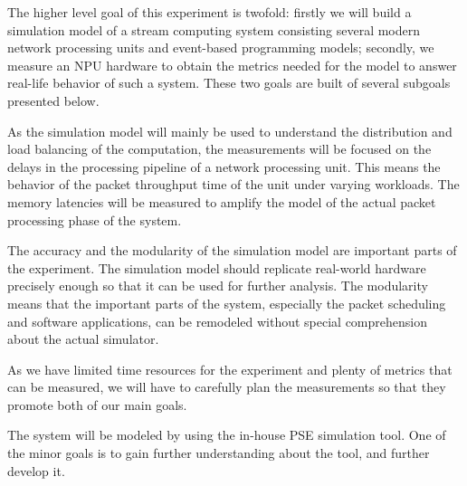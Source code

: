 The higher level goal of this experiment is twofold: firstly we will build a simulation model of a stream computing system consisting several modern network processing units and event-based programming models; secondly, we measure an NPU hardware to obtain the metrics needed for the model to answer real-life behavior of such a system. These two goals are built of several subgoals presented below.

As the simulation model will mainly be used to understand the distribution and load balancing of the computation, the measurements will be focused on the delays in the processing pipeline of a network processing unit. This means the behavior of the packet throughput time of the unit under varying workloads. The memory latencies will be measured to amplify the model of the actual packet processing phase of the system.

The accuracy and the modularity of the simulation model are important parts of the experiment. The simulation model should replicate real-world hardware precisely enough so that it can be used for further analysis. The modularity means that the important parts of the system, especially the packet scheduling and software applications, can be remodeled without special comprehension about the actual simulator.

As we have limited time resources for the experiment and plenty of metrics that can be measured, we will have to carefully plan the measurements so that they promote both of our main goals.

The system will be modeled by using the in-house PSE simulation tool. One of the minor goals is to gain further understanding about the tool, and further develop it.

